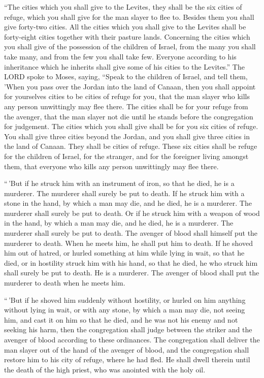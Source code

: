  ``The cities which you shall give to the Levites, they
shall be the six cities of refuge, which you shall give for the man
slayer to flee to. Besides them you shall give forty-two cities.
 All the cities which you shall give to the Levites shall be
forty-eight cities together with their pasture lands. 
Concerning the cities which you shall give of the possession of the
children of Israel, from the many you shall take many, and from the few
you shall take few. Everyone according to his inheritance which he
inherits shall give some of his cities to the Levites.'' 
The LORD spoke to Moses, saying,  ``Speak to the children
of Israel, and tell them, 'When you pass over the Jordan into the land
of Canaan,  then you shall appoint for yourselves cities to
be cities of refuge for you, that the man slayer who kills any person
unwittingly may flee there.  The cities shall be for your
refuge from the avenger, that the man slayer not die until he stands
before the congregation for judgement.  The cities which
you shall give shall be for you six cities of refuge.  You
shall give three cities beyond the Jordan, and you shall give three
cities in the land of Canaan. They shall be cities of refuge.
 These six cities shall be refuge for the children of
Israel, for the stranger, and for the foreigner living amongst them,
that everyone who kills any person unwittingly may flee there.

 ``\,'But if he struck him with an instrument of iron, so
that he died, he is a murderer. The murderer shall surely be put to
death.  If he struck him with a stone in the hand, by which
a man may die, and he died, he is a murderer. The murderer shall surely
be put to death.  Or if he struck him with a weapon of wood
in the hand, by which a man may die, and he died, he is a murderer. The
murderer shall surely be put to death.  The avenger of
blood shall himself put the murderer to death. When he meets him, he
shall put him to death.  If he shoved him out of hatred, or
hurled something at him while lying in wait, so that he died,
 or in hostility struck him with his hand, so that he died,
he who struck him shall surely be put to death. He is a murderer. The
avenger of blood shall put the murderer to death when he meets him.

 ``\,'But if he shoved him suddenly without hostility, or
hurled on him anything without lying in wait,  or with any
stone, by which a man may die, not seeing him, and cast it on him so
that he died, and he was not his enemy and not seeking his harm,
 then the congregation shall judge between the striker and
the avenger of blood according to these ordinances.  The
congregation shall deliver the man slayer out of the hand of the avenger
of blood, and the congregation shall restore him to his city of refuge,
where he had fled. He shall dwell therein until the death of the high
priest, who was anointed with the holy oil.


